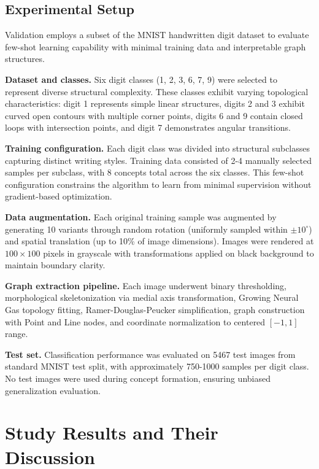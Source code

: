 \documentclass[a4paper,10pt]{article}
\begin{document}
\subsection{Experimental Setup}

Validation employs a subset of the MNIST handwritten digit dataset to evaluate few-shot learning capability with minimal training data and interpretable graph structures.

\textbf{Dataset and classes.} Six digit classes (1, 2, 3, 6, 7, 9) were selected to represent diverse structural complexity. These classes exhibit varying topological characteristics: digit 1 represents simple linear structures, digits 2 and 3 exhibit curved open contours with multiple corner points, digits 6 and 9 contain closed loops with intersection points, and digit 7 demonstrates angular transitions.

\textbf{Training configuration.} Each digit class was divided into structural subclasses capturing distinct writing styles. Training data consisted of 2-4 manually selected samples per subclass, with 8 concepts total across the six classes. This few-shot configuration constrains the algorithm to learn from minimal supervision without gradient-based optimization.

\textbf{Data augmentation.} Each original training sample was augmented by generating 10 variants through random rotation (uniformly sampled within $\pm 10^\circ$) and spatial translation (up to 10\% of image dimensions). Images were rendered at $100 \times 100$ pixels in grayscale with transformations applied on black background to maintain boundary clarity.

\textbf{Graph extraction pipeline.} Each image underwent binary thresholding, morphological skeletonization via medial axis transformation, Growing Neural Gas topology fitting, Ramer-Douglas-Peucker simplification, graph construction with Point and Line nodes, and coordinate normalization to centered $[-1, 1]$ range.

\textbf{Test set.} Classification performance was evaluated on 5467 test images from standard MNIST test split, with approximately 750-1000 samples per digit class. No test images were used during concept formation, ensuring unbiased generalization evaluation.

\section{Study Results and Their Discussion}
\end{document}
